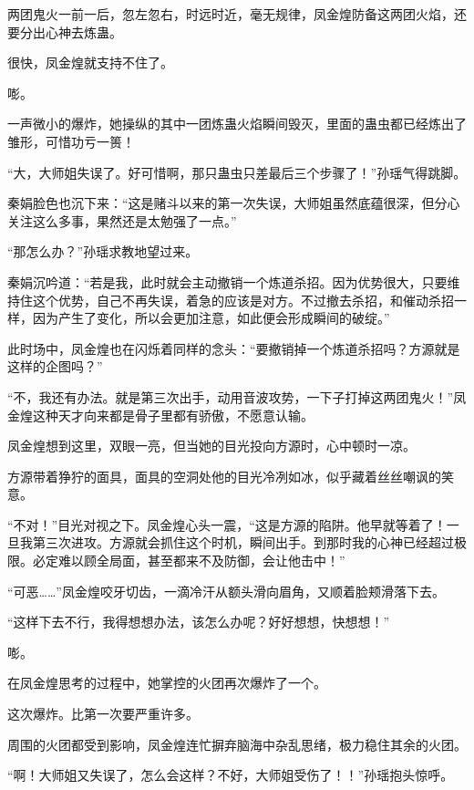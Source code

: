 
\begin{this_body}



两团鬼火一前一后，忽左忽右，时远时近，毫无规律，凤金煌防备这两团火焰，还要分出心神去炼蛊。

很快，凤金煌就支持不住了。

嘭。

一声微小的爆炸，她操纵的其中一团炼蛊火焰瞬间毁灭，里面的蛊虫都已经炼出了雏形，可惜功亏一篑！

“大，大师姐失误了。好可惜啊，那只蛊虫只差最后三个步骤了！”孙瑶气得跳脚。

秦娟脸色也沉下来：“这是赌斗以来的第一次失误，大师姐虽然底蕴很深，但分心关注这么多事，果然还是太勉强了一点。”

“那怎么办？”孙瑶求教地望过来。

秦娟沉吟道：“若是我，此时就会主动撤销一个炼道杀招。因为优势很大，只要维持住这个优势，自己不再失误，着急的应该是对方。不过撤去杀招，和催动杀招一样，因为产生了变化，所以会更加注意，如此便会形成瞬间的破绽。”

此时场中，凤金煌也在闪烁着同样的念头：“要撤销掉一个炼道杀招吗？方源就是这样的企图吗？”

“不，我还有办法。就是第三次出手，动用音波攻势，一下子打掉这两团鬼火！”凤金煌这种天才向来都是骨子里都有骄傲，不愿意认输。

凤金煌想到这里，双眼一亮，但当她的目光投向方源时，心中顿时一凉。

方源带着狰狞的面具，面具的空洞处他的目光冷冽如冰，似乎藏着丝丝嘲讽的笑意。

“不对！”目光对视之下。凤金煌心头一震，“这是方源的陷阱。他早就等着了！一旦我第三次进攻。方源就会抓住这个时机，瞬间出手。到那时我的心神已经超过极限。必定难以顾全局面，甚至都来不及防御，会让他击中！”

“可恶……”凤金煌咬牙切齿，一滴冷汗从额头滑向眉角，又顺着脸颊滑落下去。

“这样下去不行，我得想想办法，该怎么办呢？好好想想，快想想！”

嘭。

在凤金煌思考的过程中，她掌控的火团再次爆炸了一个。

这次爆炸。比第一次要严重许多。

周围的火团都受到影响，凤金煌连忙摒弃脑海中杂乱思绪，极力稳住其余的火团。

“啊！大师姐又失误了，怎么会这样？不好，大师姐受伤了！！”孙瑶抱头惊呼。


\end{this_body}
